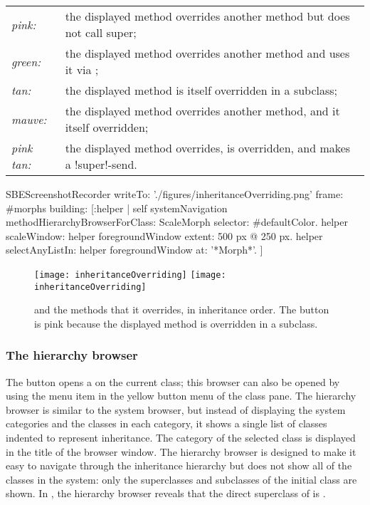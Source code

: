 \documentclass[a4paper,10pt,twoside]{book}
\begin{document}
\begin{tabular}{lp{9cm}}
	\emph{pink:} & the displayed method overrides another method but does not call super;\\
	\emph{green:} & the displayed method overrides another method and uses it via \super;\\
	\emph{tan:} & the displayed method is itself overridden in a subclass;\\
	\emph{mauve:} & the displayed method overrides another method, and it itself overridden;\\
	\emph{pink tan:} & the displayed method overrides, is overridden, and makes a \ct!super!-send.
\end{tabular}

\begin{ExecuteSmalltalkScript}
SBEScreenshotRecorder writeTo: './figures/inheritanceOverriding.png' frame: #morphs building: [:helper |
	self systemNavigation
		methodHierarchyBrowserForClass: ScaleMorph
		selector: #defaultColor.
	helper scaleWindow: helper foregroundWindow extent: 500 px @ 250 px.
	helper selectAnyListIn: helper foregroundWindow at: '*Morph*'.
]
\end{ExecuteSmalltalkScript}
\begin{figure}[tbp]
	\begin{center}
   \ifluluelse
		{\texttt{[image: inheritanceOverriding]}}
		{\texttt{[image: inheritanceOverriding]}}
	\end{center}
	\caption{ and the methods that it overrides, in inheritance order.
	The  button is pink because the displayed method is overridden in a subclass.}
	\label{fig:inheritanceOverriding}
\end{figure}


\subsubsection{The hierarchy browser}
\label{sec:hierarchy}

The  button opens a  on the current class; this browser can also be opened by using the  menu item in the yellow button menu of the class pane.
The hierarchy browser is similar to the system browser, but instead of displaying the system categories and the classes in each category, it shows a single list of classes indented to represent inheritance.
The category of the selected class is displayed in the title of the browser window.
The hierarchy browser is designed to make it easy to navigate through the inheritance hierarchy but does not show all of the classes in the system: only the superclasses and subclasses of the initial class are shown.
In , the hierarchy browser reveals that the direct superclass of  is .
\end{document}

